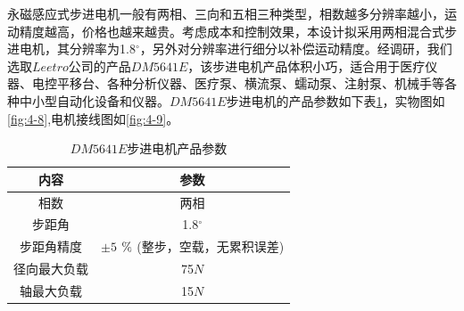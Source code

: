 永磁感应式步进电机一般有两相、三向和五相三种类型，相数越多分辨率越小，运动精度越高，价格也越来越贵。考虑成本和控制效果，本设计拟采用两相混合式步进电机，其分辨率为1.8$^ \circ $，另外对分辨率进行细分以补偿运动精度。经调研，我们选取$Leetro$公司的产品$DM5641E$，该步进电机产品体积小巧，适合用于医疗仪器、电控平移台、各种分析仪器、医疗泵、横流泵、蠕动泵、注射泵、机械手\supercite{bib14}等各种中小型自动化设备和仪器。$DM5641E$步进电机的产品参数如下表\ref{tab:4-1}，实物图如\ref{fig:4-8},电机接线图如\ref{fig:4-9}。

\begin{table}[htbp]
	\centering
	\caption{$DM5641E$步进电机产品参数}
	\begin{tabular}{cc}
		\toprule
		\toprule
		内容    & 参数 \\
		\midrule
		相数  & 两相  \\
		步距角  & 1.8$^ \circ $ \\
		步距角精度  & $\pm5$ ${\rm{\% }}$ (整步，空载，无累积误差) \\
		径向最大负载  & 75$N$  \\
		轴最大负载  & 15$N$  \\
		\bottomrule
		\bottomrule
	\end{tabular}%
	\label{tab:4-1}%
\end{table}%

